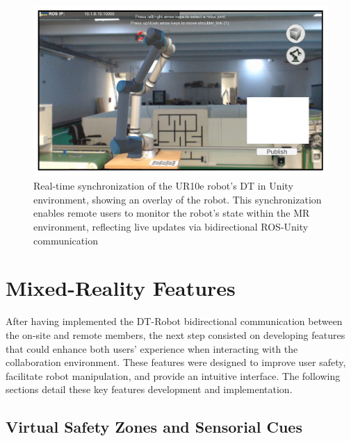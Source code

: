 \begin{figure}[h]
    \centering
    \includegraphics[width=\linewidth]{figs/super-imposed-robot.png}
    \caption{Real-time synchronization of the UR10e robot’s \ac{DT} in Unity environment, showing an overlay of the robot. This synchronization enables remote users to monitor the robot's state within the \ac{MR} environment, reflecting live updates via bidirectional \ac{ROS}-Unity communication}
    \label{fig:robot-unity}
\end{figure}


\section{Mixed-Reality Features}
\label{section:on-site-features}
After having implemented the \ac{DT}-Robot bidirectional communication between the on-site and remote members, the next step consisted on developing features that could enhance both users' experience when interacting with the collaboration environment. These features were designed to improve user safety, facilitate robot manipulation, and provide an intuitive interface. The following sections detail these key features development and implementation.


\subsection{Virtual Safety Zones and Sensorial Cues}
\label{subsection:virtual-safety-zones} 

